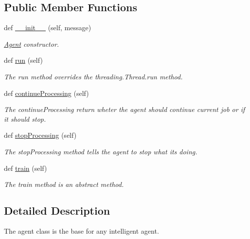 \subsection*{Public Member Functions}
\begin{DoxyCompactItemize}
\item 
def \hyperlink{classDQN-Deepmind-NIPS-2013_1_1agent_1_1Agent_1_1Agent_a3902963eaecb4b9dbe9bd0c06c2f9f01}{\+\_\+\+\_\+init\+\_\+\+\_\+} (self, message)
\begin{DoxyCompactList}\small\item\em \hyperlink{classDQN-Deepmind-NIPS-2013_1_1agent_1_1Agent_1_1Agent}{Agent} constructor. \end{DoxyCompactList}\item 
def \hyperlink{classDQN-Deepmind-NIPS-2013_1_1agent_1_1Agent_1_1Agent_ae41ae14645afb3279112e9d02991be99}{run} (self)
\begin{DoxyCompactList}\small\item\em The run method overrides the threading.\+Thread.\+run method. \end{DoxyCompactList}\item 
def \hyperlink{classDQN-Deepmind-NIPS-2013_1_1agent_1_1Agent_1_1Agent_a6cb1d914ca2954f968d2512f4dac3a36}{continue\+Processing} (self)
\begin{DoxyCompactList}\small\item\em The continue\+Processing return wheter the agent should continue current job or if it should stop. \end{DoxyCompactList}\item 
def \hyperlink{classDQN-Deepmind-NIPS-2013_1_1agent_1_1Agent_1_1Agent_a1662a18fd255f7c6e7a696ad4dd45304}{stop\+Processing} (self)
\begin{DoxyCompactList}\small\item\em The stop\+Processing method tells the agent to stop what it\textquotesingle{}s doing. \end{DoxyCompactList}\item 
def \hyperlink{classDQN-Deepmind-NIPS-2013_1_1agent_1_1Agent_1_1Agent_ae3b350736392d8ce39e7973d630f437a}{train} (self)
\begin{DoxyCompactList}\small\item\em The train method is an abstract method. \end{DoxyCompactList}\end{DoxyCompactItemize}


\subsection{Detailed Description}
The agent class is the base for any intelligent agent. 

